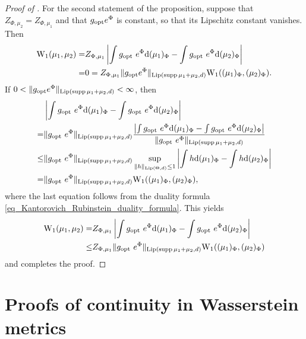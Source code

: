 \documentclass[a4paper]{scrartcl}
\theoremstyle{definition}
\numberwithin{equation}{section}
\newcommand{\rd}{\mathrm{d}}
\DeclareMathOperator{\supp}{supp}
\newcommand{\Abs}[1]{\left\vert#1\right\vert}
\newcommand{\norm}[1]{\Vert #1 \Vert}
\newcommand{\Lip}[0]{\textup{Lip}}
\newcommand{\Was}[0]{\textup{W}}
\newcommand{\opt}[0]{\textup{opt}}
\begin{document}
\begin{proof}[Proof of ]
For the second statement of the proposition, suppose that $Z_{\Phi,\mu_2}=Z_{\Phi,\mu_1}$ and that $g_\opt e^\Phi$ is constant, so that its Lipschitz constant vanishes. Then
\begin{align*}
 \Was_1(\mu_1,\mu_2)=&Z_{\Phi,\mu_1}\Abs{\int g_\opt ~e^\Phi \rd (\mu_1)_\Phi-\int g_\opt ~e^\Phi \rd (\mu_2)_\Phi}
 \\
 =&0= Z_{\Phi,\mu_1}\norm{g_\opt e^\Phi}_{\Lip(\supp{\mu_1+\mu_2},d)}\Was_1((\mu_1)_\Phi,(\mu_2)_\Phi).
\end{align*}
If $0<\norm{g_\opt e^\Phi}_{\Lip(\supp{\mu_1+\mu_2},d)}<\infty$, then
\begin{align*}
 &\Abs{\int g_\opt ~e^\Phi \rd (\mu_1)_\Phi-\int g_\opt ~e^\Phi \rd (\mu_2)_\Phi}
 \\
 =&\norm{g_\opt ~e^\Phi}_{\Lip(\supp{\mu_1+\mu_2},d)}\frac{\Abs{\int g_\opt ~e^\Phi \rd (\mu_1)_\Phi-\int g_\opt ~e^\Phi \rd (\mu_2)_\Phi}}{\norm{g_\opt ~e^\Phi}_{\Lip(\supp{\mu_1+\mu_2},d)}}
 \\
 \leq & \norm{g_\opt ~e^\Phi}_{\Lip(\supp{\mu_1+\mu_2},d)}\sup_{\norm{h}_{\Lip(\Theta,d)}\leq 1}\Abs{\int h \rd (\mu_1)_\Phi-\int h \rd (\mu_2)_\Phi}
 \\
 =& \norm{g_\opt ~e^\Phi}_{\Lip(\supp{\mu_1+\mu_2},d)}\Was_1((\mu_1)_\Phi,(\mu_2)_\Phi),
\end{align*}
where the last equation follows from the duality formula \eqref{eq_Kantorovich_Rubinstein_duality_formula}.
This yields
\begin{align*}
 \Was_1(\mu_1,\mu_2)=&Z_{\Phi,\mu_1}\Abs{\int g_\opt ~e^\Phi \rd (\mu_1)_\Phi-\int g_\opt ~e^\Phi \rd (\mu_2)_\Phi}
 \\
 \leq& Z_{\Phi,\mu_1}\norm{g_\opt ~e^\Phi}_{\Lip(\supp{\mu_1+\mu_2},d)}\Was_1((\mu_1)_\Phi,(\mu_2)_\Phi)
\end{align*}
and completes the proof.
\end{proof}

\section{Proofs of continuity in Wasserstein metrics}
\label{section_continuity_in_Wp_metrics_proofs}
\end{document}
